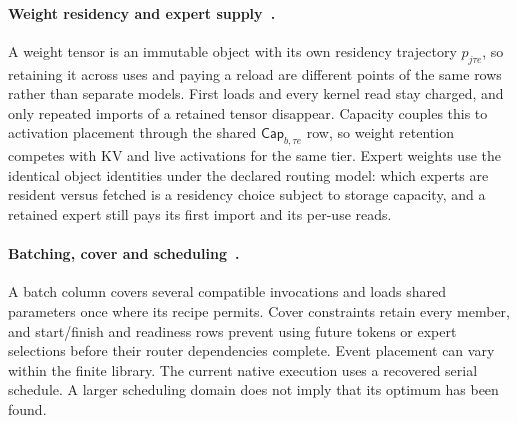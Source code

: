 \paragraph{Weight residency and expert supply~.}
A weight tensor is an immutable object with its own residency trajectory $p_{j\tau e}$, so retaining it across uses and paying a reload are different points of the same rows rather than separate models.
First loads and every kernel read stay charged, and only repeated imports of a retained tensor disappear.
Capacity couples this to activation placement through the shared $\mathsf{Cap}_{b,\tau e}$ row, so weight retention competes with KV and live activations for the same tier.
Expert weights use the identical object identities under the declared routing model: which experts are resident versus fetched is a residency choice subject to storage capacity, and a retained expert still pays its first import and its per-use reads.

\paragraph{Batching, cover and scheduling~.}
A batch column covers several compatible invocations and loads shared parameters once where its recipe permits.
Cover constraints retain every member, and start/finish and readiness rows prevent using future tokens or expert selections before their router dependencies complete.
Event placement can vary within the finite library.
The current native execution uses a recovered serial schedule.
A larger scheduling domain does not imply that its optimum has been found.

